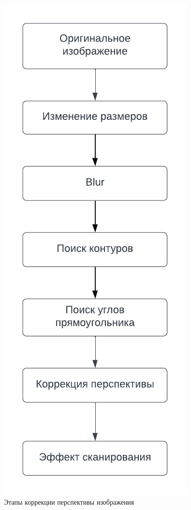 \begin{figure}
    \includegraphics[scale=0.75]{img/perspective_correction}
    \caption{Этапы коррекции перспективы изображения}
    \label{perspective_correction_algo}
\end{figure}

